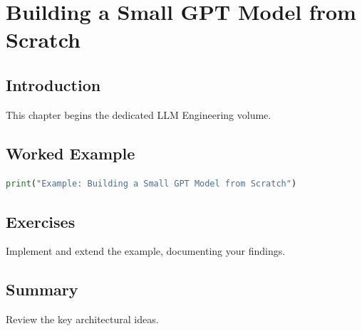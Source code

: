 \chapter{Building a Small GPT Model from Scratch}
\label{chap:vol9-5}



\section{Introduction}
This chapter begins the dedicated LLM Engineering volume.

\section{Worked Example}
\begin{lstlisting}[language=Python]
print("Example: Building a Small GPT Model from Scratch")
\end{lstlisting}

\section{Exercises}
\begin{exercise}
Implement and extend the example, documenting your findings.
\end{exercise}

\section{Summary}
Review the key architectural ideas.

